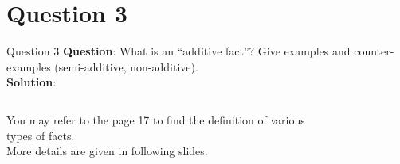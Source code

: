 \section*{Question 3}
\begin{frame}[fragile]{Question 3}
\textbf{Question}: What is an ``additive fact''? Give examples and counter-examples (semi-additive, non-additive).\\\vspace{10pt}
\textbf{Solution}:\\ \vspace{5pt}
\begin{columns}[t,onlytextwidth]
You may refer to the page 17 to find the definition of various types of facts.\\\vspace{5pt}
More details are given in following slides.
\begin{figure}
	\vspace{-15pt}
\end{figure}
\end{columns}
\end{frame}

